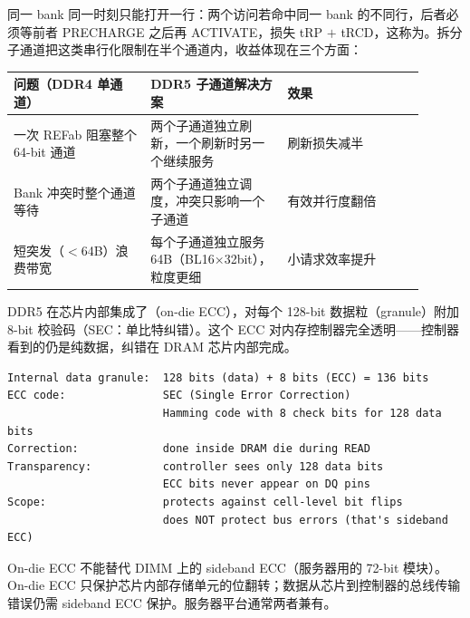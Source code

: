 
同一 bank 同一时刻只能打开一行：两个访问若命中同一 bank 的不同行，后者必须等前者 PRECHARGE 之后再 ACTIVATE，损失 tRP $+$ tRCD，这称为。拆分子通道把这类串行化限制在半个通道内，收益体现在三个方面：

\begin{longtable}{L{0.3\linewidth}L{0.3\linewidth}L{0.3\linewidth}}
\toprule
问题（DDR4 单通道） & DDR5 子通道解决方案 & 效果 \\
\midrule
一次 REFab 阻塞整个 64-bit 通道 & 两个子通道独立刷新，一个刷新时另一个继续服务 & 刷新损失减半 \\\tablerowrule
Bank 冲突时整个通道等待 & 两个子通道独立调度，冲突只影响一个子通道 & 有效并行度翻倍 \\\tablerowrule
短突发（$<$64B）浪费带宽 & 每个子通道独立服务 64B（BL16×32bit），粒度更细 & 小请求效率提升 \\
\bottomrule
\end{longtable}


DDR5 在芯片内部集成了（on-die ECC），对每个 128-bit 数据粒（granule）附加 8-bit 校验码（SEC：单比特纠错）。这个 ECC 对内存控制器完全透明——控制器看到的仍是纯数据，纠错在 DRAM 芯片内部完成。

\begin{lstlisting}[numbers=none,caption={DDR5 on-die ECC 结构}]
Internal data granule:  128 bits (data) + 8 bits (ECC) = 136 bits
ECC code:               SEC (Single Error Correction)
                        Hamming code with 8 check bits for 128 data bits
Correction:             done inside DRAM die during READ
Transparency:           controller sees only 128 data bits
                        ECC bits never appear on DQ pins
Scope:                  protects against cell-level bit flips
                        does NOT protect bus errors (that's sideband ECC)
\end{lstlisting}

\begin{warningbox}
On-die ECC 不能替代 DIMM 上的 sideband ECC（服务器用的 72-bit 模块）。On-die ECC 只保护芯片内部存储单元的位翻转；数据从芯片到控制器的总线传输错误仍需 sideband ECC 保护。服务器平台通常两者兼有。
\end{warningbox}


